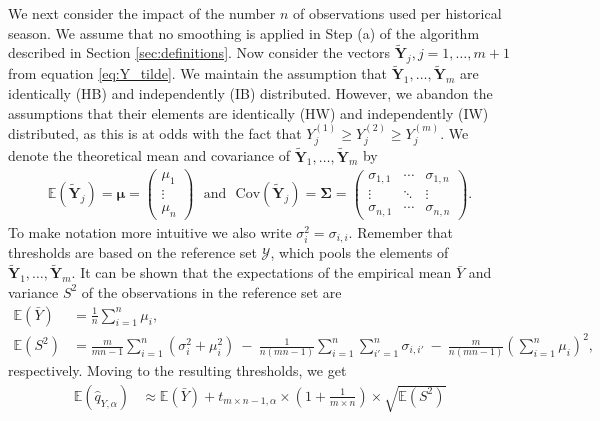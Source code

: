\documentclass[12pt]{article}
\begin{document}
We next consider the impact of the number $n$ of observations used per historical season. We assume that no smoothing is applied in Step (a) of the algorithm described in Section \ref{sec:definitions}. Now consider the vectors $\tilde{\mathbf{Y}}_j, j = 1, \dots, m + 1$ from equation \eqref{eq:Y_tilde}. We maintain the assumption that $\tilde{\mathbf{Y}}_1, \dots, \tilde{\mathbf{Y}}_m$ are identically (HB) and independently (IB) distributed. However, we abandon the assumptions that their elements are identically (HW) and independently (IW) distributed, as this is at odds with the fact that $Y_j^{(1)} \geq Y_j^{(2)} \geq Y_j^{(m)}$. We denote the theoretical mean and covariance of $\tilde{\mathbf{Y}}_1, \dots, \tilde{\mathbf{Y}}_m$ by
\begin{align}
\mathbb{E}\left(\tilde{\mathbf{Y}}_j\right) = \boldsymbol{\mu} = \left(\begin{array}{c}
\mu_1\\
\vdots\\
\mu_n
\end{array}\right) \ \ \ \text{and} \ \ \ \text{Cov}\left(\tilde{\mathbf{Y}}_j\right) = \boldsymbol{\Sigma} =
\left(\begin{array}{ccc}
\sigma_{1, 1} & \cdots & \sigma_{1, n}\\
\vdots & \ddots &\vdots\\
\sigma_{n, 1} & \cdots & \sigma_{n, n}
\end{array}\right).
\end{align}
To make notation more intuitive we also write $\sigma^2_i = \sigma_{i, i}$. Remember that thresholds are based on the reference set $\mathcal{Y}$, which pools the elements of $\tilde{\mathbf{Y}}_1, \dots, \tilde{\mathbf{Y}}_m$. It can be shown that the expectations of the empirical mean $\bar{Y}$ and variance $S^2$ of the observations in the reference set are
\begin{align}
\mathbb{E}(\bar{Y}) & = \frac{1}{n} \sum_{i = 1}^n \mu_i,
\label{eq:expectation_mu}\\
\mathbb{E}(S^2) & = \frac{m}{mn - 1} \sum_{i = 1}^n (\sigma_{i}^2 + \mu_i^2) \ - \ \frac{1}{n(mn - 1)} \sum_{i = 1}^n \sum_{i' = 1}^n \sigma_{i,i'} \ - \ \frac{m}{n(mn - 1)}\left(\sum_{i = 1}^n \mu_i\right)^2,
\label{eq:expectation_sigma2}
\end{align}
respectively. Moving to the resulting thresholds, we get
\begin{align}
\mathbb{E}(\hat{q}_{Y, \alpha}) & \approx \mathbb{E}(\bar{Y}) + t_{m\times n - 1, \alpha} \times \left(1 + \frac{1}{m\times n} \right) \times \sqrt{\mathbb{E}(S^2)}
\label{eq:expectation_q}
\end{align}
\end{document}
